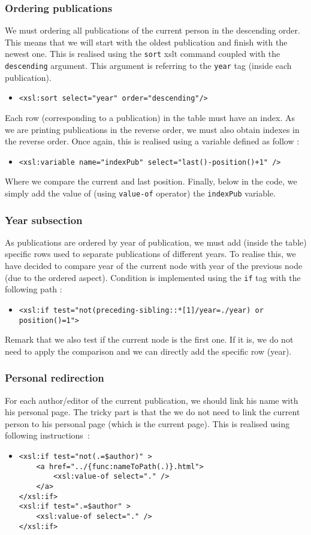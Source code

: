 \documentclass{article}
\begin{document}
\subsubsection{Ordering publications}
We must ordering all publications of the current person in the descending order. This means that we will start with the oldest publication and finish with the newest one. This is realised using the \verb|sort| xslt command coupled with the \verb|descending| argument. This argument is referring to the \verb|year| tag (inside each publication).
\begin{itemize}
\item \verb|<xsl:sort select="year" order="descending"/>|
\end{itemize}
Each row (corresponding to a publication) in the table must have an index. As we are printing publications in the reverse order, we must also obtain indexes in the reverse order. Once again, this is realised using a variable defined as follow :
\begin{itemize}
\item \verb|<xsl:variable name="indexPub" select="last()-position()+1" />|
\end{itemize}
Where we compare the current and last position. Finally, below in the code, we simply add the value of (using \verb|value-of| operator) the \verb|indexPub| variable. 
\subsubsection{Year subsection}
As publications are ordered by year of publication, we must add (inside the table) specific rows used to separate publications of different years. To realise this, we have decided to compare year of the current node with year of the previous node (due to the ordered aspect). Condition is implemented using the \verb|if| tag with the following path :
\begin{itemize}
\item \verb|<xsl:if test="not(preceding-sibling::*[1]/year=./year) or position()=1">|
\end{itemize}
Remark that we also test if the current node is the first one. If it is, we do not need to apply the comparison and we can directly add the specific row (year).
\subsubsection{Personal redirection}
For each author/editor of the current publication, we should link his name with his personal page. The tricky part is that the we do not need to link the current person to his personal page (which is the current page). This is realised using following instructions~:
\begin{itemize}
\item \begin{verbatim}
<xsl:if test="not(.=$author)" >
    <a href="../{func:nameToPath(.)}.html">
        <xsl:value-of select="." />
    </a>
</xsl:if>
<xsl:if test=".=$author" >
    <xsl:value-of select="." />
</xsl:if>
\end{verbatim}
\end{itemize}
\end{document}
